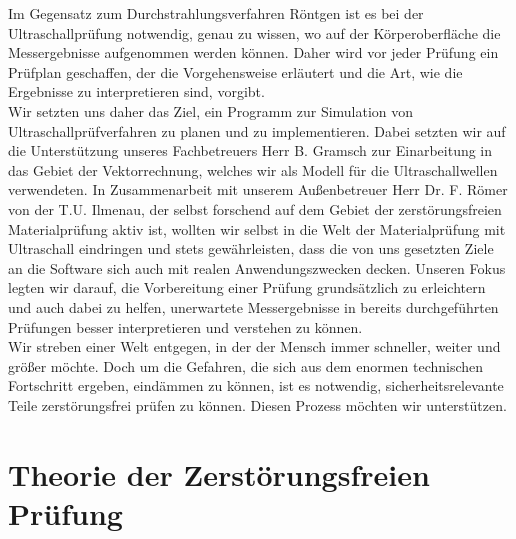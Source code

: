 \documentclass[reducespace,stylepage,semiarbeit]{spezidoc}
\begin{document}
Im Gegensatz zum Durchstrahlungsverfahren Röntgen ist es bei der Ultraschallprüfung notwendig, genau zu wissen, wo auf der Körperoberfläche die Messergebnisse aufgenommen werden können. Daher wird vor jeder Prüfung ein Prüfplan geschaffen, der die Vorgehensweise erläutert und die Art, wie die Ergebnisse zu interpretieren sind, vorgibt.\\
Wir setzten uns daher das Ziel, ein Programm zur Simulation von Ultraschallprüfverfahren zu planen und zu implementieren. Dabei setzten wir auf die Unterstützung unseres Fachbetreuers Herr B. Gramsch zur Einarbeitung in das Gebiet der Vektorrechnung, welches wir als Modell für die Ultraschallwellen verwendeten. In Zusammenarbeit mit unserem Außenbetreuer Herr Dr. F. Römer von der T.U. Ilmenau, der selbst forschend auf dem Gebiet der zerstörungsfreien Materialprüfung aktiv ist, wollten wir selbst in die Welt der Materialprüfung mit Ultraschall eindringen und stets gewährleisten, dass die von uns gesetzten Ziele an die Software sich auch mit realen Anwendungszwecken decken.
Unseren Fokus legten wir darauf, die Vorbereitung einer Prüfung grundsätzlich zu erleichtern und auch dabei zu helfen, unerwartete Messergebnisse in bereits durchgeführten Prüfungen besser interpretieren und verstehen zu können.\\
Wir streben einer Welt entgegen, in der der Mensch immer schneller, weiter und größer möchte. Doch um die Gefahren, die sich aus dem enormen technischen Fortschritt ergeben, eindämmen zu können, ist es notwendig, sicherheitsrelevante Teile zerstörungsfrei prüfen zu können. Diesen Prozess möchten wir unterstützen.

\newpage

\section{Theorie der Zerstörungsfreien Prüfung}
\end{document}
